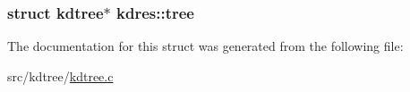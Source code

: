 \subsubsection[{tree}]{\setlength{\rightskip}{0pt plus 5cm}struct {\bf kdtree}$\ast$ kdres\+::tree}\label{structkdres_a76eebf2c192b36e4ee8a320969f02b13}


The documentation for this struct was generated from the following file\+:\begin{DoxyCompactItemize}
\item 
src/kdtree/\hyperlink{kdtree_8c}{kdtree.\+c}\end{DoxyCompactItemize}
